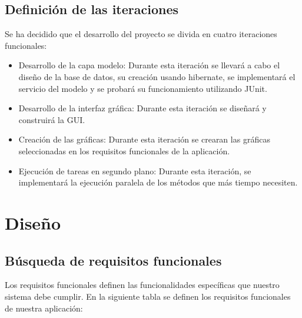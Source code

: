 \documentclass[12pt, a4paper]{book}
\begin{document}
\newpage

\section{Definición de las iteraciones}

Se ha decidido que el desarrollo del proyecto se divida en cuatro iteraciones funcionales:

\begin{itemize}
	\item Desarrollo de la capa modelo: Durante esta iteración se llevará a cabo el diseño de la base de datos, su creación usando hibernate, se implementará el servicio del modelo y se probará su funcionamiento utilizando JUnit. 
	\item Desarrollo de la interfaz gráfica: Durante esta iteración se diseñará y construirá la \gls{GUI}.
	\item Creación de las gráficas: Durante esta iteración se crearan las gráficas seleccionadas en los requisitos funcionales de la aplicación.
	\item Ejecución de tareas en segundo plano: Durante esta iteración, se implementará la ejecución paralela de los métodos que más tiempo necesiten.
\end{itemize}

\newpage
\chapter{Diseño}

\section{Búsqueda de requisitos funcionales}

Los requisitos funcionales definen las funcionalidades específicas que nuestro sistema debe cumplir. En la siguiente tabla se definen los requisitos funcionales de nuestra aplicación:
\end{document}
